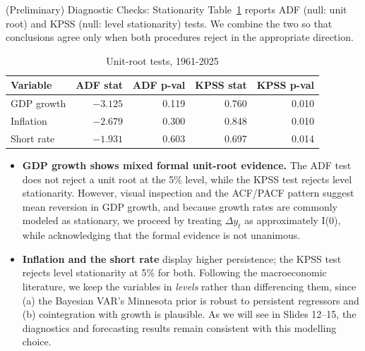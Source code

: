 \documentclass[9pt]{beamer}
\begin{document}
\begin{frame}{(Preliminary) Diagnostic Checks: Stationarity}
\footnotesize
Table~\ref{tab:stationarity} reports ADF (null: unit root) and KPSS (null: level stationarity) tests. We combine the two so that conclusions agree only when both procedures reject in the appropriate direction.

\begin{table}[ht]
\footnotesize
\centering
\caption{\footnotesize Unit-root tests, 1961-2025}
\begin{tabular}{lrrrr}
\toprule
\textbf{Variable} & \textbf{ADF stat} & \textbf{ADF p-val} & \textbf{KPSS stat} & \textbf{KPSS p-val} \\
\midrule
GDP growth & $-3.125$ & 0.119 & 0.760 & 0.010 \\
Inflation  & $-2.679$ & 0.300 & 0.848 & 0.010 \\
Short rate & $-1.931$ & 0.603 & 0.697 & 0.014 \\
\bottomrule
\end{tabular}
\label{tab:stationarity}
\end{table}

\footnotesize
\begin{itemize}
  \item \textbf{GDP growth shows mixed formal unit-root evidence.} The ADF test does not reject a unit root at the 5\% level, while the KPSS test rejects level stationarity. However, visual inspection and the ACF/PACF pattern suggest mean reversion in GDP growth, and because growth rates are commonly modeled as stationary, we proceed by treating $\Delta y_t$ as approximately I(0), while acknowledging that the formal evidence is not unanimous.

  \item \textbf{Inflation and the short rate} display higher persistence; the KPSS test rejects level stationarity at 5\% for both. Following the macroeconomic literature, we keep the variables in \textit{levels} rather than differencing them, since (a) the Bayesian VAR's Minnesota prior is robust to persistent regressors and (b) cointegration with growth is plausible. As we will see in Slides 12–15, the diagnostics and forecasting results remain consistent with this modelling choice.
\end{itemize}

\end{frame}
\end{document}
